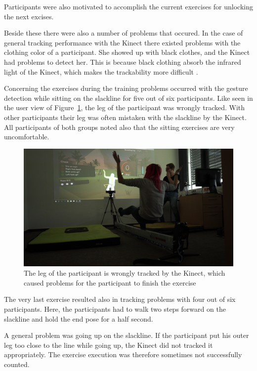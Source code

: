 Participants were also motivated to accomplish the current exercises for unlocking the next excises.

Beside these there were also a number of problems that occured.
In the case of general tracking performance with the Kinect there existed problems with the clothing color of a participant.
She showed up with black clothes, and the Kinect had problems to detect her.
This is because black clothing absorb the infrared light of the Kinect, which makes the trackability more difficult \cite{KinectBlackClothing}.

Concerning the exercises during the training problems occurred with the gesture detection while sitting on the slackline for five out of six participants.
Like seen in the user view of Figure~\ref{fig:6_5_sittingProblems}, the leg of the participant was wrongly tracked.
With other participants their leg was often mistaken with the slackline by the Kinect.
All participants of both groups noted also that the sitting exercises are very uncomfortable.
\begin{figure}[htb]
	\centering
	\includegraphics[width=0.88\linewidth]{Pictures/6_5_sitting}
	\caption{The leg of the participant is wrongly tracked by the Kinect, which caused problems for the participant to finish the exercise}
	\label{fig:6_5_sittingProblems}
\end{figure}

The very last exercise resulted also in tracking problems with four out of six participants.
Here, the participants had to walk two steps forward on the slackline and hold the end pose for a half second.

A general problem was going up on the slackline.
If the participant put his outer leg too close to the line while going up, the Kinect did not tracked it appropriately.
The exercise execution was therefore sometimes not successfully counted.

